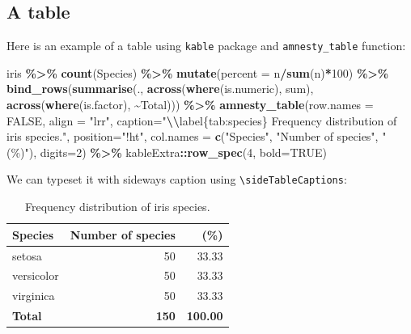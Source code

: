 \documentclass[
  freefonts, nologo]{amnestyreport}
\newenvironment{Shaded}{\begin{snugshade}}{\end{snugshade}}
\newcommand{\AttributeTok}[1]{\textcolor[rgb]{0.13,0.29,0.53}{#1}}
\newcommand{\ConstantTok}[1]{\textcolor[rgb]{0.56,0.35,0.01}{#1}}
\newcommand{\DecValTok}[1]{\textcolor[rgb]{0.00,0.00,0.81}{#1}}
\newcommand{\FunctionTok}[1]{\textcolor[rgb]{0.13,0.29,0.53}{\textbf{#1}}}
\newcommand{\NormalTok}[1]{#1}
\newcommand{\SpecialCharTok}[1]{\textcolor[rgb]{0.81,0.36,0.00}{\textbf{#1}}}
\newcommand{\StringTok}[1]{\textcolor[rgb]{0.31,0.60,0.02}{#1}}
\begin{document}
\subsection{A table}\label{a-table}

Here is an example of a table using \texttt{kable} package and
\texttt{amnesty\_table} function:

\begin{Shaded}
\begin{Highlighting}[]
\NormalTok{iris }\SpecialCharTok{\%\textgreater{}\%} 
  \FunctionTok{count}\NormalTok{(Species) }\SpecialCharTok{\%\textgreater{}\%} 
  \FunctionTok{mutate}\NormalTok{(}\AttributeTok{percent =}\NormalTok{ n}\SpecialCharTok{/}\FunctionTok{sum}\NormalTok{(n)}\SpecialCharTok{*}\DecValTok{100}\NormalTok{) }\SpecialCharTok{\%\textgreater{}\%} 
  \FunctionTok{bind\_rows}\NormalTok{(}\FunctionTok{summarise}\NormalTok{(., }\FunctionTok{across}\NormalTok{(}\FunctionTok{where}\NormalTok{(is.numeric), sum),}
                      \FunctionTok{across}\NormalTok{(}\FunctionTok{where}\NormalTok{(is.factor), }\SpecialCharTok{\textasciitilde{}}\StringTok{\textquotesingle{}Total\textquotesingle{}}\NormalTok{))) }\SpecialCharTok{\%\textgreater{}\%} 
  \FunctionTok{amnesty\_table}\NormalTok{(}\AttributeTok{row.names =} \ConstantTok{FALSE}\NormalTok{,}
                \AttributeTok{align =} \StringTok{"lrr"}\NormalTok{,}
        \AttributeTok{caption=}\StringTok{"}\SpecialCharTok{\textbackslash{}\textbackslash{}}\StringTok{label\{tab:species\}}
\StringTok{        Frequency distribution of iris species."}\NormalTok{,}
        \AttributeTok{position=}\StringTok{"!ht"}\NormalTok{,}
        \AttributeTok{col.names =} \FunctionTok{c}\NormalTok{(}\StringTok{"Species"}\NormalTok{, }\StringTok{"Number of species"}\NormalTok{, }\StringTok{"(\%)"}\NormalTok{),}
        \AttributeTok{digits=}\DecValTok{2}\NormalTok{) }\SpecialCharTok{\%\textgreater{}\%}
\NormalTok{  kableExtra}\SpecialCharTok{::}\FunctionTok{row\_spec}\NormalTok{(}\DecValTok{4}\NormalTok{, }\AttributeTok{bold=}\ConstantTok{TRUE}\NormalTok{)}
\end{Highlighting}
\end{Shaded}

We can typeset it with sideways caption using
\texttt{\textbackslash{}sideTableCaptions}: \sideTableCaptions

\begin{table}[!ht]

\caption{\label{tab:example_table}\label{tab:species}
        Frequency distribution of iris species.}
\centering
\begin{tabular}[t]{lrr}
\toprule
\textbf{Species} & \textbf{Number of species} & \textbf{(\%)}\\
\midrule
setosa & 50 & 33.33\\
versicolor & 50 & 33.33\\
virginica & 50 & 33.33\\
\textbf{Total} & \textbf{150} & \textbf{100.00}\\
\bottomrule
\end{tabular}
\end{table}
\end{document}

